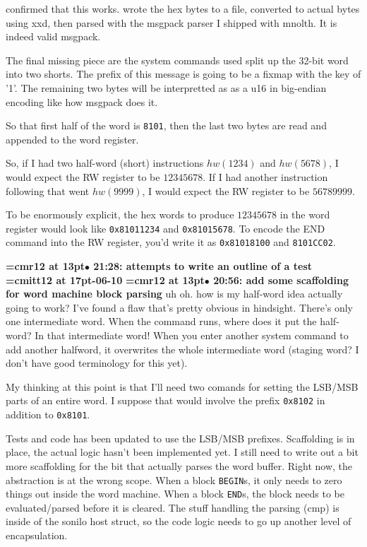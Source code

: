 confirmed that this works. wrote the hex bytes to a file, converted to actual bytes using xxd, then parsed with the msgpack parser I shipped with mnolth. It is indeed valid msgpack.
\par

The final missing piece are the system commands used split up the 32-bit word into two shorts. The prefix of this message is going to be a fixmap with the key of '1'. The remaining two bytes will be interpretted as as a u16 in big-endian encoding like how msgpack does it.
\par

So that first half of the word is {\tt 8101}, then the last two bytes are read and appended to the word register.
\par

So, if I had two half-word (short) instructions $hw(1234)$ and $hw(5678)$, I would expect the RW register to be $12345678$. If I had another instruction following that went $hw(9999)$, I would expect the RW register to be $56789999$.
\par

To be enormously explicit, the hex words to produce $12345678$ in the word register would look like {\tt 0x81011234} and {\tt 0x81015678}. To encode the END command into the RW register, you'd write it as {\tt 0x81018100} and {\tt 8101CC02}.
\par

{\smallskip\noindent\bf\font\titlefont=cmr12 at 13pt\titlefont $\bullet$ 21:28: attempts to write an outline of a test}\smallskip
{\medskip\noindent\bf\font\titlefont=cmitt12 at 17pt-06-10}\medskip
{\smallskip\noindent\bf\font\titlefont=cmr12 at 13pt\titlefont $\bullet$ 20:56: add some scaffolding for word machine block parsing}\smallskip
uh oh. how is my half-word idea actually going to work? I've found a flaw that's pretty obvious in hindsight. There's only one intermediate word. When the command runs, where does it put the half-word? In that intermediate word! When you enter another system command to add another halfword, it overwrites the whole intermediate word (staging word? I don't have good terminology for this yet).
\par

My thinking at this point is that I'll need two comands for setting the LSB/MSB parts of an entire word. I suppose that would involve the prefix {\tt 0x8102} in addition to {\tt 0x8101}.
\par

Tests and code has been updated to use the LSB/MSB prefixes. Scaffolding is in place, the actual logic hasn't been implemented yet. I still need to write out a bit more scaffolding for the bit that actually parses the word buffer. Right now, the abstraction is at the wrong scope. When a block {\tt BEGIN}s, it only needs to zero things out inside the word machine. When a block {\tt END}s, the block needs to be evaluated/parsed before it is cleared. The stuff handling the parsing (cmp) is inside of the sonilo host struct, so the code logic needs to go up another level of encapsulation.
\par

